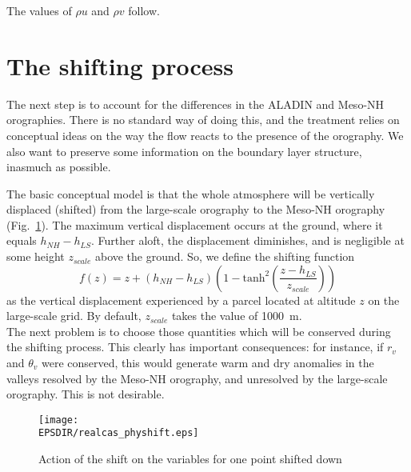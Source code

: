 The values of $\rho u$ and $\rho v$ follow.

\section{The shifting process}

The next step is to account for the differences in the ALADIN and Meso-NH
orographies. There is no standard way of doing this, and the treatment
relies on conceptual ideas on the way the flow reacts to the presence of
the orography. We also want to preserve some information on the boundary
layer structure, inasmuch as possible.

The basic conceptual model is that the whole atmosphere will be vertically
displaced (shifted) from the large-scale orography to the Meso-NH orography
(Fig.~\ref{physhift}). The maximum vertical
displacement occurs at the ground, where it equals $h_{NH}-h_{LS}$. Further
aloft, the displacement diminishes, and is negligible at some height
$z_{scale}$ above the ground. So, we define the shifting function
\begin{equation}
\label{shift}
f(z)=z+(h_{NH}-h_{LS})\left( 1-\mbox{tanh}^2
\left(\frac{z-h_{LS}}{z_{scale}}\right)\right)
\end{equation}
as the vertical displacement experienced by a parcel located at altitude
$z$ on the large-scale grid.
By default, $z_{scale}$ takes the value of 1000~m.\\

The next problem is to choose those quantities which will be conserved
during the shifting process. This clearly has important consequences: for
instance, if $r_v$ and $\theta_v$ were conserved, this would generate
warm and dry anomalies in the valleys resolved by the Meso-NH orography,
and unresolved by the large-scale orography. This is not desirable.

\clearpage


\begin{figure}[!ht]
\centerline{\texttt{[image: \\EPSDIR/realcas\_physhift.eps]}}
\caption{Action of the shift on the variables for one point shifted down
\label{physhift}}
\end{figure}

\clearpage

